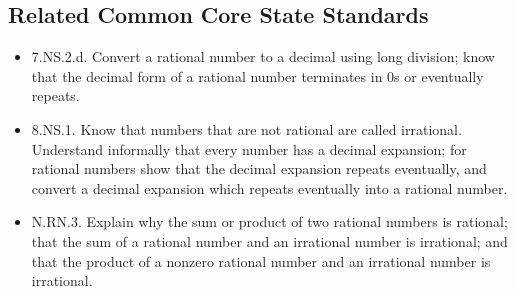 \documentclass[space,nooutcomes]{ximera}
\begin{document}
\subsection*{Related Common Core State Standards}
\begin{itemize}
\item 7.NS.2.d.  Convert a rational number to a decimal using long division; know that the decimal form of a rational number terminates in 0s or eventually repeats.

\item 8.NS.1. Know that numbers that are not rational are called irrational.  Understand informally that every number has a decimal expansion; for rational numbers show that the decimal expansion repeats eventually, and convert a decimal expansion which repeats eventually into a rational number.

\item N.RN.3. Explain why the sum or product of two rational numbers is rational; that the sum of a rational number and an irrational number is irrational; and that the product of a nonzero rational number and an irrational number is irrational.
\end{itemize}
\end{document}
